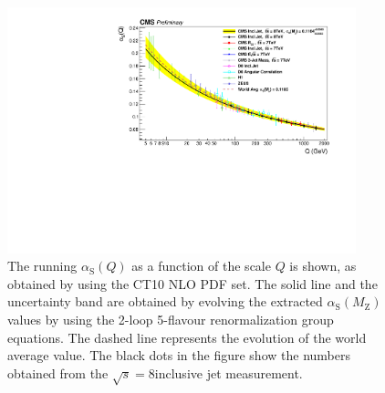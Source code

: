 \documentclass{PoS}
\def\asq{\ensuremath{\alpha_\mathrm{S}(Q)}\xspace}
\providecommand{\alpsmz}{\ensuremath{\alpha_\mathrm{S}(M_\mathrm{Z})}\xspace}
\begin{document}
\begin{figure}[hbpt]
  \centering
 \includegraphics[width=0.9\textwidth]{Figure4.pdf}
 \caption{The running \asq as a function of the scale $Q$ is shown, as
   obtained by using the CT10 NLO PDF set. The solid line and the
   uncertainty band are obtained by evolving the extracted \alpsmz
   values by using the 2-loop 5-flavour renormalization group
   equations. The dashed line represents the evolution of the world
   average value. The black dots in the figure show the numbers
   obtained from the $\sqrt{s}=8$\TeV inclusive jet
   measurement. %
 }
\label{fig:AlphasRun}
\end{figure}
\end{document}
